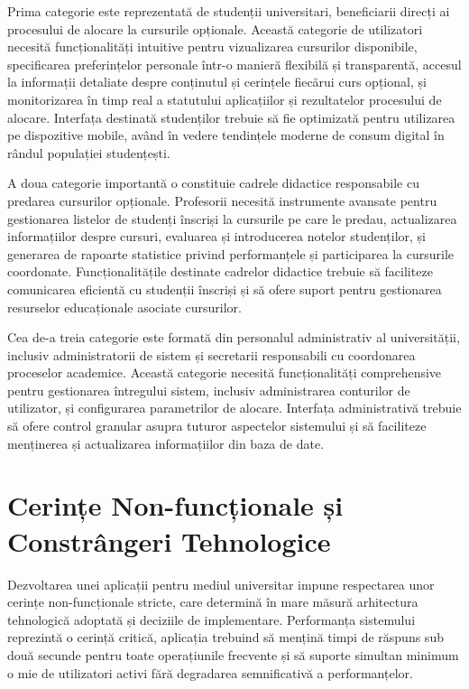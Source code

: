 \documentclass[12pt,a4paper]{report}
\begin{document}
Prima categorie este reprezentată de studenții universitari, beneficiarii direcți ai procesului de alocare la cursurile opționale. Această categorie de utilizatori necesită funcționalități intuitive pentru vizualizarea cursurilor disponibile, specificarea preferințelor personale într-o manieră flexibilă și transparentă, accesul la informații detaliate despre conținutul și cerințele fiecărui curs opțional, și monitorizarea în timp real a statutului aplicațiilor și rezultatelor procesului de alocare. Interfața destinată studenților trebuie să fie optimizată pentru utilizarea pe dispozitive mobile, având în vedere tendințele moderne de consum digital în rândul populației studențești.

A doua categorie importantă o constituie cadrele didactice responsabile cu predarea cursurilor opționale. Profesorii necesită instrumente avansate pentru gestionarea listelor de studenți înscriși la cursurile pe care le predau, actualizarea informațiilor despre cursuri, evaluarea și introducerea notelor studenților, și generarea de rapoarte statistice privind performanțele și participarea la cursurile coordonate. Funcționalitățile destinate cadrelor didactice trebuie să faciliteze comunicarea eficientă cu studenții înscriși și să ofere suport pentru gestionarea resurselor educaționale asociate cursurilor.

Cea de-a treia categorie este formată din personalul administrativ al universității, inclusiv administratorii de sistem și secretarii responsabili cu coordonarea proceselor academice. Această categorie necesită funcționalități comprehensive pentru gestionarea întregului sistem, inclusiv administrarea conturilor de utilizator, și configurarea parametrilor de alocare. Interfața administrativă trebuie să ofere control granular asupra tuturor aspectelor sistemului și să faciliteze menținerea și actualizarea informațiilor din baza de date.

\section{Cerințe Non-funcționale și Constrângeri Tehnologice}

Dezvoltarea unei aplicații pentru mediul universitar impune respectarea unor cerințe non-funcționale stricte, care determină în mare măsură arhitectura tehnologică adoptată și deciziile de implementare. Performanța sistemului reprezintă o cerință critică, aplicația trebuind să mențină timpi de răspuns sub două secunde pentru toate operațiunile frecvente și să suporte simultan minimum o mie de utilizatori activi fără degradarea semnificativă a performanțelor.
\end{document}
